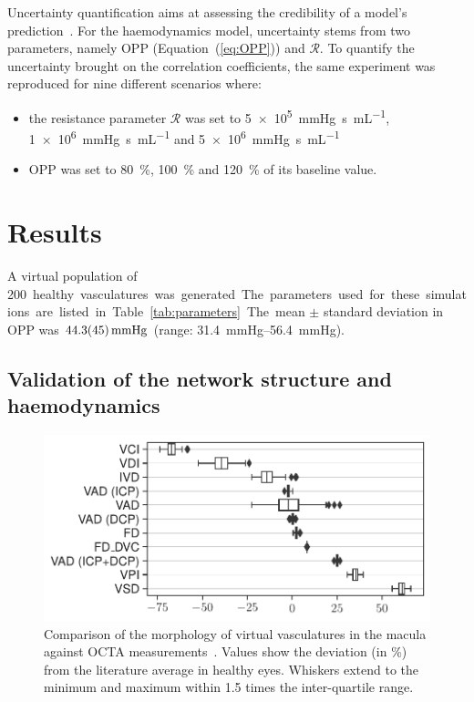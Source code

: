 \documentclass[11pt,]{article}
\begin{document}
Uncertainty quantification aims at assessing the credibility of a model's prediction~\cite{ASME2018,Viceconti2021}.
For the haemodynamics model, uncertainty stems from two parameters, namely OPP (Equation~(\ref{eq:OPP})) and $\mathcal R$.
To quantify the uncertainty brought on the correlation coefficients, the same experiment was reproduced for nine different scenarios where:
\begin{itemize}
\item the resistance parameter $\mathcal R$ was set to \SI[per-mode=symbol]{5e5}{\mmHg\second\per\mL}, \SI[per-mode=symbol]{1e6}{\mmHg\second\per\mL} and \SI[per-mode=symbol]{5e6}{\mmHg\second\per\mL}
\item OPP was set to \SI{80}{\percent}, \SI{100}{\percent} and \SI{120}{\percent} of its baseline value.
\end{itemize}


\section{Results}\label{sec:results}

A virtual population of \SI{200} healthy vasculatures was generated.
The parameters used for these simulations are listed in Table~\ref{tab:parameters}. %
The mean $\pm$ standard deviation in OPP was $\SI{44.3 \pm 4.5}{\mmHg}$ (range: \SIrange{31.4}{56.4}{\mmHg}).

\subsection{Validation of the network structure and haemodynamics}\label{sec:validation}

\begin{figure}[ht!]
  \centering
  \includegraphics[width=.95\textwidth]{Baseline_metrics}
  \caption{\label{fig:OCTAValidation}Comparison of the morphology of virtual vasculatures in the macula against OCTA measurements~\cite{Chu2016,Liu_2021,Ma2021}. Values show the deviation (in \%) from the literature average in healthy eyes. Whiskers extend to the minimum and maximum within \SI{1.5}{} times the inter-quartile range.}  
\end{figure}
\end{document}
